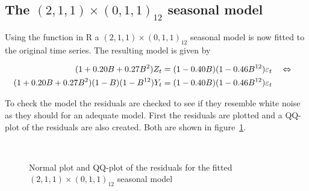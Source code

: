 \FloatBarrier

\subsection*{The $(2,1,1)\times(0,1,1)_{12}$ seasonal model}

Using the  function in R a $(2,1,1)\times(0,1,1)_{12}$ seasonal
model is now fitted to the original time series. The resulting model is given
by \par

\begin{align*}
    (1 + 0.20B + 0.27B^2)Z_t &= (1-0.40B)(1-0.46B^{12})\varepsilon_t \quad\Leftrightarrow\quad\\
    (1 + 0.20B + 0.27B^2)(1-B)(1-B^{12})Y_t &= (1-0.40B)(1-0.46B^{12})\varepsilon_t 
\end{align*}

To check the model the residuals are checked to see if they resemble white
noise as they should for an adequate model. First the residuals are plotted and
a QQ-plot of the residuals are also created. Both are shown in
figure~\ref{fig:qq-residuals-m1}. \par

\begin{figure}[htb]
    \centering
    \mbox{
         \quad 
    }
    \caption{Normal plot and QQ-plot of the residuals for the fitted $(2,1,1)\times(0,1,1)_{12}$ seasonal model}
    \label{fig:qq-residuals-m1}
\end{figure}

